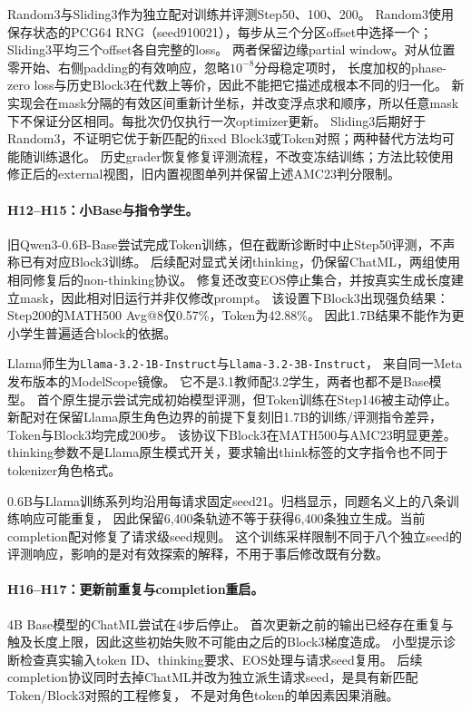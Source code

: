 Random3与Sliding3作为独立配对训练并评测Step50、100、200。
Random3使用保存状态的PCG64 RNG（seed910021），每步从三个分区offset中选择一个；Sliding3平均三个offset各自完整的loss。
两者保留边缘partial window。对从位置零开始、右侧padding的有效响应，忽略$10^{-8}$分母稳定项时，
长度加权的phase-zero loss与历史Block3在代数上等价，因此不能把它描述成根本不同的归一化。
新实现会在mask分隔的有效区间重新计坐标，并改变浮点求和顺序，所以任意mask下不保证分区相同。每批次仍仅执行一次optimizer更新。
Sliding3后期好于Random3，不证明它优于新匹配的fixed Block3或Token对照；两种替代方法均可能随训练退化。
历史grader恢复修复评测流程，不改变冻结训练；方法比较使用修正后的external视图，旧内置视图单列并保留上述AMC23判分限制。

\paragraph{H12--H15：小Base与指令学生。}
旧Qwen3-0.6B-Base尝试完成Token训练，但在截断诊断时中止Step50评测，不声称已有对应Block3训练。
后续配对显式关闭thinking，仍保留ChatML，两组使用相同修复后的non-thinking协议。
修复还改变EOS停止集合，并按真实生成长度建立mask，因此相对旧运行并非仅修改prompt。
该设置下Block3出现强负结果：Step200的MATH500 Avg@8仅0.57\%，Token为42.88\%。
因此1.7B结果不能作为更小学生普遍适合block的依据。

Llama师生为\texttt{Llama-3.2-1B-Instruct}与\texttt{Llama-3.2-3B-Instruct}，
来自同一Meta发布版本的ModelScope镜像\citep{llama32}。
它不是3.1教师配3.2学生，两者也都不是Base模型。
首个原生提示尝试完成初始模型评测，但Token训练在Step146被主动停止。
新配对在保留Llama原生角色边界的前提下复刻旧1.7B的训练/评测指令差异，Token与Block3均完成200步。
该协议下Block3在MATH500与AMC23明显更差。
thinking参数不是Llama原生模式开关，要求输出think标签的文字指令也不同于tokenizer角色格式。

0.6B与Llama训练系列均沿用每请求固定seed21。归档显示，同题名义上的八条训练响应可能重复，
因此保留6,400条轨迹不等于获得6,400条独立生成。当前completion配对修复了请求级seed规则。
这个训练采样限制不同于八个独立seed的评测响应，影响的是对有效探索的解释，不用于事后修改既有分数。

\paragraph{H16--H17：更新前重复与completion重启。}
4B Base模型的ChatML尝试在4步后停止。
首次更新之前的输出已经存在重复与触及长度上限，因此这些初始失败不可能由之后的Block3梯度造成。
小型提示诊断检查真实输入token ID、thinking要求、EOS处理与请求seed复用。
后续completion协议同时去掉ChatML并改为独立派生请求seed，是具有新匹配Token/Block3对照的工程修复，
不是对角色token的单因素因果消融。

